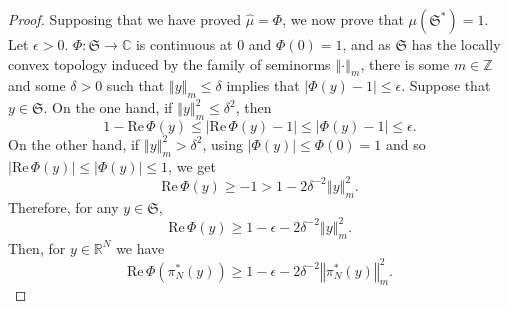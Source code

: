 \documentclass{article}
\def\Re{\ensuremath{\mathrm{Re}}\,}
\newcommand{\norm}[1]{\left\Vert #1 \right\Vert}
\theoremstyle{definition}
\theoremstyle{definition}
\begin{document}
\begin{proof}
Supposing that we have proved $\hat{\mu}=\Phi$, we now prove that $\mu(\mathfrak{S}^*)=1$.
Let $\epsilon>0$. $\Phi:\mathfrak{S} \to \mathbb{C}$ is continuous at $0$ and $\Phi(0)=1$, and as $\mathfrak{S}$ has the locally convex
topology induced by the family of seminorms $\norm{\cdot}_m$,
 there is some $m \in \mathbb{Z}$
and some $\delta>0$ such that $\norm{y}_m \leq \delta$ implies that $|\Phi(y)-1| \leq \epsilon$. Suppose that $y \in \mathfrak{S}$.
On the one hand, if $\norm{y}_m^2 \leq \delta^2$, then
\[
1-\Re \Phi(y)  \leq |\Re \Phi(y)-1| \leq |\Phi(y)-1| \leq \epsilon.
\]
On the other hand, if $\norm{y}_m^2 > \delta^2$, using $|\Phi(y)| \leq \Phi(0)=1$ and so $ |\Re \Phi(y)| \leq |\Phi(y)| \leq 1$, we
get  
\[
\Re \Phi(y) \geq -1 > 1 - 2\delta^{-2} \norm{y}_m^2.
\]
Therefore, for any $y \in \mathfrak{S}$,
\[
\Re \Phi(y) \geq 1-\epsilon-2\delta^{-2} \norm{y}_m^2.
\]
Then, for $y \in \mathbb{R}^N$ we have
\begin{equation}
\Re \Phi(\pi_N^*(y)) \geq 1-\epsilon-2\delta^{-2} \norm{\pi_N^*(y)}_m^2.
\label{realphi}
\end{equation}


\end{proof}
\end{document}
